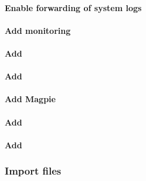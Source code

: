 \documentclass[letterpaper]{article}
\begin{document}
\vspace*{-.2cm}
\paragraph{Enable forwarding of system logs} \label{sec:add_syslog}


\clearpage
\paragraph{Add \Nagios{} monitoring} \label{sec:add_nagios}


\clearpage
\paragraph{Add \clustershell{}}


%

\paragraph{Add \genders{}}


\vspace*{-.1cm}
\paragraph{Add Magpie}


\vspace*{-.1cm}
\paragraph{Add \conman{}} \label{sec:add_conman}


\vspace*{-.1cm}
\paragraph{Add \nhc{}} \label{sec:add_nhc}


\subsubsection{Import files} \label{sec:file_import}


\vspace*{0.2cm}



\end{document}
